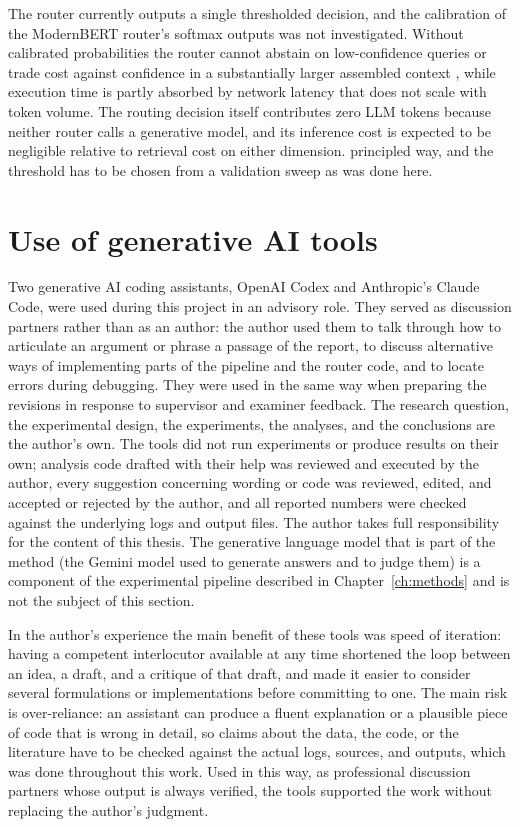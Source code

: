 \documentclass[english, bibtex]{kththesis}               %
\numberwithin{listing}{chapter}
\providecommand{\DIFaddtex}[1]{{\protect\color{blue} \sf #1}} %
\providecommand{\DIFdeltex}[1]{{\protect\color{red} \scriptsize #1}} %
\providecommand{\DIFaddbegin}{} %
\providecommand{\DIFaddend}{} %
\providecommand{\DIFdelbegin}{} %
\providecommand{\DIFdelend}{} %
\providecommand{\DIFadd}[1]{\texorpdfstring{\DIFaddtex{#1}}{#1}} %
\providecommand{\DIFdel}[1]{\texorpdfstring{\DIFdeltex{#1}}{}} %
\begin{document}
\DIFadd{The router currently outputs a single thresholded decision, and the calibration of the ModernBERT router's softmax outputs was not investigated. Without calibrated probabilities the router cannot abstain on low-confidence queries or trade cost against confidence in }\DIFaddend a \DIFdelbegin \DIFdel{substantially larger assembled context \cite{lightrag2024,microsoft2024graphragcosts}, while execution time is partly absorbed by network latency that does not scale with token volume.
The routing decision itself contributes zero LLM tokens because neither router calls a generative model, and its inference cost is expected to be negligible relative to retrieval cost on either dimension. }\DIFdelend \DIFaddbegin \DIFadd{principled way, and the threshold has to be chosen from a validation sweep as was done here.
}\DIFaddend 

\DIFaddbegin \section{Use of generative AI tools}
\label{sec:discGenAI}

\DIFadd{Two generative AI coding assistants, OpenAI Codex and Anthropic's Claude Code, were used during this project in an advisory role. They served as discussion partners rather than as an author: the author used them to talk through how to articulate an argument or phrase a passage of the report, to discuss alternative ways of implementing parts of the pipeline and the router code, and to locate errors during debugging. They were used in the same way when preparing the revisions in response to supervisor and examiner feedback. The research question, the experimental design, the experiments, the analyses, and the conclusions are the author's own. The tools did not run experiments or produce results on their own; analysis code drafted with their help was reviewed and executed by the author, every suggestion concerning wording or code was reviewed, edited, and accepted or rejected by the author, and all reported numbers were checked against the underlying logs and output files. The author takes full responsibility for the content of this thesis. The generative language model that is part of the method (the Gemini model used to generate answers and to judge them) is a component of the experimental pipeline described in Chapter~\ref{ch:methods} and is not the subject of this section.
}

\DIFadd{In the author's experience the main benefit of these tools was speed of iteration: having a competent interlocutor available at any time shortened the loop between an idea, a draft, and a critique of that draft, and made it easier to consider several formulations or implementations before committing to one. The main risk is over-reliance: an assistant can produce a fluent explanation or a plausible piece of code that is wrong in detail, so claims about the data, the code, or the literature have to be checked against the actual logs, sources, and outputs, which was done throughout this work. Used in this way, as professional discussion partners whose output is always verified, the tools supported the work without replacing the author's judgment.
}
\end{document}
